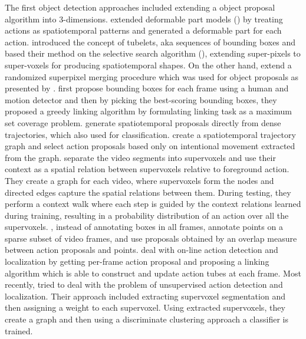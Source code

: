 The first object detection approaches included extending a object proposal algorithm into 3-dimensions. \cite{6619185} extended deformable part models (\cite{5255236})  by treating actions as spatiotemporal patterns and generated a deformable part for each action. \cite{6909495} introduced the concept of tubelets, aka sequences of bounding boxes and based their method on the selective search algorithm
(\cite{Uijlings13}), extending super-pixels to super-voxels for producing spatiotemporal shapes. On the other hand, \cite{Oneata}
extend a randomized superpixel merging procedure which was used for object proposals as presented by \cite{Manen:2013:POP:2586117.2587333}.
\cite{7298735} first propose bounding boxes for each frame using a human and motion detector and then by picking the best-scoring bounding boxes,
they proposed a greedy linking algorithm by formulating linking task as a maximum set coverage problem. \cite{BMVC2015_177} generate spatiotemporal proposals directly from dense trajectories, which also used for classification. \cite{7410734} create a spatiotemporal trajectory
graph and select action proposals based only on intentional movement extracted from the graph. \cite{7410732} separate the video segments
into supervoxels and use their context as a spatial relation between supervoxels relative to foreground action. They create a graph for each
video, where supervoxels form the nodes and directed edges capture the spatial relations between them. During testing, they  perform a context
walk where each step is guided by the context relations learned during training, resulting in a probability distribution of an action over all the supervoxels. \cite{DBLP:journals/corr/MettesGS16}, instead of annotating boxes in all frames, annotate points on a sparse subset of video
frames, and use proposals obtained by an overlap measure between action proposals and points. \cite{DBLP:journals/corr/BehlSSSCT17} deal with
on-line action detection and localization by getting per-frame action proposal and  proposing a linking algorithm which is able to construct and update action tubes at each frame.
Most recently, \cite{8237344} tried to deal with the problem of unsupervised
action detection and localization. Their approach included extracting supervoxel segmentation and then assigning a weight to each supervoxel.
Using extracted supervoxels, they create a graph and then using a discriminate clustering approach a classifier is trained.\par

\par

